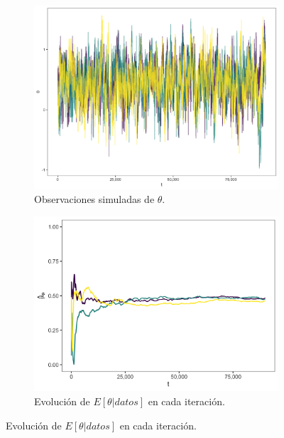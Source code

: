 \documentclass[11pt,a4paper]{article}
\begin{document}
\begin{figure}[!htb]
    \centering
    \begin{subfigure}[t]{0.45\textwidth}
       \centering\includegraphics[width=\linewidth]{theta_traceplot.png}
       \caption{Observaciones simuladas de $\theta$.}
       \label{fig:theta_trace}
    \end{subfigure}
    \hfill
    \begin{subfigure}[t]{0.45\textwidth}
       \centering\includegraphics[width=\linewidth]{theta_ergodic_means.png}
      \caption{Evolución de $E \left[ \theta | datos \right]$ en cada iteración.}
       \label{fig:theta_means}
    \end{subfigure}


\end{figure}
\end{document}
